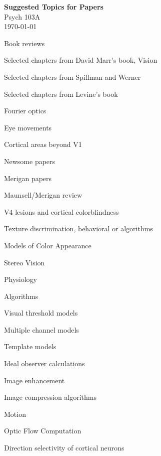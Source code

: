 



\begin{center}
{\bf Suggested Topics for Papers} \\
Psych 103A \\
\today
\end{center}

\be

\item Book reviews
 \be
  \item Selected chapters from David Marr's book, Vision
  \item Selected chapters from Spillman and Werner
  \item Selected chapters from Levine's book
 \ee

\item Fourier optics
\item Eye movements
\item Cortical areas beyond V1
\be 
 \item Newsome papers
 \item Merigan papers
 \item Maunsell/Merigan review
 \item V4 lesions and cortical colorblindness
\ee
\item Texture discrimination, behavioral or algorithms
\item Models of Color Appearance

\item Stereo Vision
\be
 \item Physiology
 \item Algorithms
\ee

\item Visual threshold models
\be
 \item Multiple channel models
 \item Template models
 \item Ideal observer calculations
\ee

\item Image enhancement
\item Image compression algorithms

\item Motion
\be
 \item Optic Flow Computation
 \item Direction selectivity of cortical neurons
\ee

\ee



